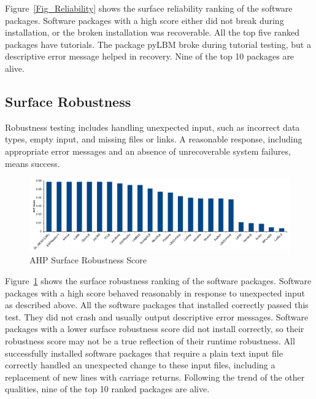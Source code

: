 \documentclass[final, 3p, times, authoryear]{elsarticle}
\begin{document}
Figure~\ref{Fig_Reliability} shows the surface reliability ranking of the
software packages. Software packages with a high score either did not break
during installation, or the broken installation was recoverable. All the top
five ranked packages have tutorials. The package pyLBM broke during tutorial
testing, but a descriptive error message helped in recovery. Nine of the top 10
packages are alive. 

\subsection{Surface Robustness} \label{Sec_Robustness}

Robustness testing includes handling unexpected input, such as incorrect data
types, empty input, and missing files or links. A reasonable response, including
appropriate error messages and an absence of unrecoverable system failures,
means success. 

\begin{figure}[h!]
	\begin{center}
		\includegraphics[width=1.0\textwidth]{./figures/robustness_chart.pdf}
		\caption{AHP Surface Robustness Score}
		\label{Fig_Robustness}
	\end{center}
\end{figure}

Figure~\ref{Fig_Robustness} shows the surface robustness ranking of the software
packages. Software packages with a high score behaved reasonably in response to
unexpected input as described above. All the software packages that installed
correctly passed this test. They did not crash and usually output descriptive
error messages. Software packages with a lower surface robustness score did not
install correctly, so their robustness score may not be a true reflection of
their runtime robustness. All successfully installed software packages that
require a plain text input file correctly handled an unexpected change to these
input files, including a replacement of new lines with carriage returns.
Following the trend of the other qualities, nine of the top 10 ranked packages
are alive.
\end{document}
